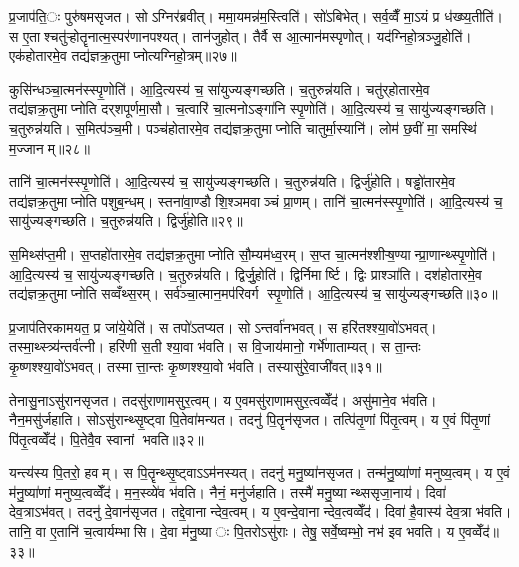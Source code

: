 
प्र॒जाप॑ति॒ः पुरु॑षमसृजत। सोऽग्निर॑ब्रवीत्। ममा॒यमन्न॑म॒स्त्विति॑। सो॑ऽबिभेत्। सर्व॒व्वैँ मा॒ऽयं प्र ध॑ख्ष्य॒तीति॑। स ए॒ताश्चतु॑ऱ्होतॄनात्म॒स्पर॑णानपश्यत्। तान॑जुहोत्। तैर्वै स आ॒त्मान॑मस्पृणोत्। यद॑ग्निहो॒त्रञ्जु॒होति॑। एक॑होतारमे॒व तद्य॑ज्ञक्र॒तुमाप्नोत्यग्निहो॒त्रम्॥२७॥

कुसि॑न्धञ्चा॒त्मन॑स्स्पृ॒णोति॑। आ॒दि॒त्यस्य॑ च॒ सा॑युज्यङ्गच्छति। च॒तुरुन्न॑यति। चतु॑र्‌होतारमे॒व तद्य॑ज्ञक्र॒तुमाप्नोति दर्‌शपूर्णमा॒सौ। च॒त्वारि॑ चा॒त्मनोऽङ्गा॑नि स्पृ॒णोति॑। आ॒दि॒त्यस्य॑ च॒ सायु॑ज्यङ्गच्छति। च॒तुरुन्न॑यति। स॒मित्प॑ञ्च॒मी। पञ्च॑होतारमे॒व तद्य॑ज्ञक्र॒तुमाप्नोति चातुर्मा॒स्यानि॑। लोम॑ छ॒वीं मा॒समस्थि॑ म॒ज्जानम्॥२८॥

तानि॑ चा॒त्मन॑स्स्पृ॒णोति॑। आ॒दि॒त्यस्य॑ च॒ सायु॑ज्यङ्गच्छति। च॒तुरुन्न॑यति। द्विर्जु॑होति। षड्ढो॑तारमे॒व तद्य॑ज्ञक्र॒तुमाप्नोति पशुब॒न्धम्। स्तना॑वा॒ण्डौ शि॒श्ञमवाञ्चं प्रा॒णम्। तानि॑ चा॒त्मन॑स्स्पृ॒णोति॑। आ॒दि॒त्यस्य॑ च॒ सायु॑ज्यङ्गच्छति। च॒तुरुन्न॑यति। द्विर्जु॑होति॥२९॥

स॒मिथ्स॑प्त॒मी। स॒प्तहो॑तारमे॒व तद्य॑ज्ञक्र॒तुमाप्नोति सौ॒म्यम॑ध्व॒रम्। स॒प्त चा॒त्मन॑श्शीऱ्ष॒ण्यान्प्रा॒णान्थ्स्पृ॒णोति॑। आ॒दि॒त्यस्य॑ च॒ सायु॑ज्यङ्गच्छति। च॒तुरुन्न॑यति। द्विर्जु॒होति॑। द्विर्निमार्ष्टि। द्विः प्राश्ञा॑ति। दश॑होतारमे॒व तद्य॑ज्ञक्र॒तुमाप्नोति सव्वँथ्स॒रम्। सर्व॑ञ्चा॒त्मान॒मप॑रिवर्ग स्पृ॒णोति॑। आ॒दि॒त्यस्य॑ च॒ सायु॑ज्यङ्गच्छति॥३०॥


प्र॒जाप॑तिरकामयत॒ प्र जा॑ये॒येति॑। स तपो॑ऽतप्यत। सोऽन्तर्वा॑नभवत्। स हरि॑तश्श्या॒वो॑ऽभवत्। तस्मा॒थ्स्त्र्य॑न्तर्व॑त्नी। हरि॑णी स॒ती श्या॒वा भ॑वति। स वि॒जाय॑मानो॒ गर्भे॑णाताम्यत्। स ता॒न्तः कृ॒ष्णश्श्या॒वो॑ऽभवत्। तस्मात्ता॒न्तः कृ॒ष्णश्श्या॒वो भ॑वति। तस्यासु॑रे॒वाजी॑वत्॥३१॥

तेनासु॒नाऽसु॑रानसृजत। तदसु॑राणामसुर॒त्वम्। य ए॒वमसु॑राणामसुर॒त्वव्वेँद॑। असु॑माने॒व भ॑वति। नैन॒मसु॑र्जहाति। सोऽसु॑रान्थ्सृ॒ष्ट्वा पि॒तेवा॑मन्यत। तदनु॑ पि॒तॄन॑सृजत। तत्पि॑तृ॒णां पि॑तृ॒त्वम्। य ए॒वं पि॑तृ॒णां पि॑तृ॒त्वव्वेँद॑। पि॒तेवै॒व स्वानां भवति॥३२॥

यन्त्य॑स्य पि॒तरो॒ हवम्। स पि॒तॄन्थ्सृ॒ष्ट्वाऽऽम॑नस्यत्। तदनु॑ मनु॒ष्या॑नसृजत। तन्म॑नु॒ष्या॑णां मनुष्य॒त्वम्। य ए॒वं म॑नु॒ष्या॑णां मनुष्य॒त्वव्वेँद॑। म॒न॒स्व्ये॑व भ॑वति। नैनं॒ मनु॑र्जहाति। तस्मै॑ मनु॒ष्यान्थ्ससृजा॒नाय॑। दिवा॑ देव॒त्राऽभ॑वत्। तदनु॑ दे॒वान॑सृजत। तद्दे॒वानान्देव॒त्वम्। य ए॒वन्दे॒वानान्देव॒त्वव्वेँद॑। दिवा॑ है॒वास्य॑ देव॒त्रा भ॑वति। तानि॒ वा ए॒तानि॑ च॒त्वार्यम्भासि। दे॒वा म॑नु॒ष्याः पि॒तरोऽसु॑राः। तेषु॒ सर्वे॒ष्वम्भो॒ नभ॑ इव भवति। य ए॒वव्वेँद॑॥३३॥

